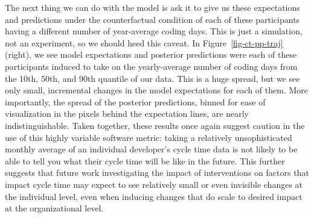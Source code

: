\documentclass[
  sn-mathphys-ay,
]{sn-jnl}
\begin{document}
The next thing we can do with the model is ask it to give us these
expectations and predictions under the counterfactual condition of each
of these participants having a different number of year-average coding
days. This is just a simulation, not an experiment, so we should heed
this caveat. In Figure~\ref{fig-ct-pp-traj} (right), we see model
expectations and posterior predictions were each of these participants
induced to take on the yearly-average number of coding days from the
10th, 50th, and 90th quantile of our data. This is a huge spread, but we
see only small, incremental changes in the model expectations for each
of them. More importantly, the spread of the posterior predictions,
binned for ease of visualization in the pixels behind the expectation
lines, are nearly indistinguishable. Taken together, these results once
again suggest caution in the use of this highly variable software
metric: taking a relatively unsophisticated monthly average of an
individual developer's cycle time data is not likely to be able to tell
you what their cycle time will be like in the future. This further
suggests that future work investigating the impact of interventions on
factors that impact cycle time may expect to see relatively small or
even invisible changes at the individual level, even when inducing
changes that do scale to desired impact at the organizational level.
\end{document}
